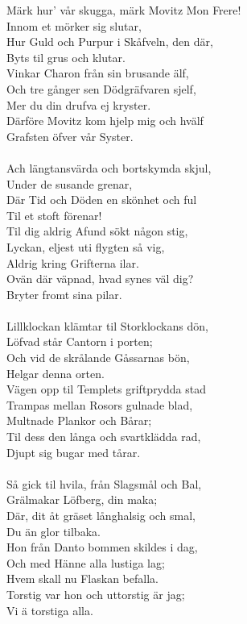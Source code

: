 \vspace{10pt}
Märk hur' vår skugga, märk Movitz Mon Frere!\\
Innom et mörker sig slutar,\\
Hur Guld och Purpur i Skåfveln, den där,\\
Byts til grus och klutar.\\
Vinkar Charon från sin brusande älf,\\
Och tre gånger sen Dödgräfvaren sjelf,\\
Mer du din drufva ej kryster.\\
Därföre Movitz kom hjelp mig och hvälf\\
Grafsten öfver vår Syster.\\
\\
Ach längtansvärda och bortskymda skjul,\\
Under de susande grenar,\\
Där Tid och Döden en skönhet och ful\\
Til et stoft förenar!\\
Til dig aldrig Afund sökt någon stig,\\
Lyckan, eljest uti flygten så vig,\\
Aldrig kring Grifterna ilar.\\
Ovän där väpnad, hvad synes väl dig?\\
Bryter fromt sina pilar.\\
\\
Lillklockan klämtar til Storklockans dön,\\
Löfvad står Cantorn i porten;\\
Och vid de skrålande Gåssarnas bön,\\
Helgar denna orten.\\
Vägen opp til Templets griftprydda stad\\
Trampas mellan Rosors gulnade blad,\\
Multnade Plankor och Bårar;\\
Til dess den långa och svartklädda rad,\\
Djupt sig bugar med tårar.\\
\\
Så gick til hvila, från Slagsmål och Bal,\\
Grälmakar Löfberg, din maka;\\
Där, dit åt gräset långhalsig och smal,\\
Du än glor tilbaka.\\
Hon från Danto bommen skildes i dag,\\
Och med Hänne alla lustiga lag;\\
Hvem skall nu Flaskan befalla.\\
Torstig var hon och uttorstig är jag;\\
Vi ä torstiga alla.
